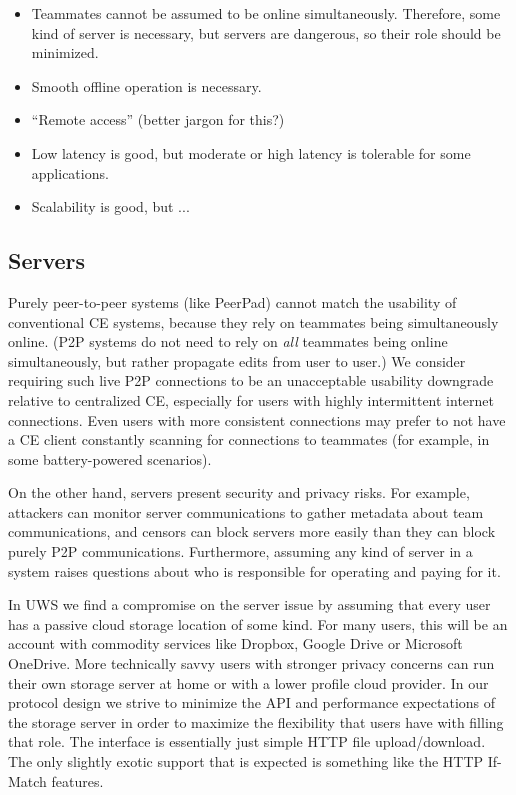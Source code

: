 \documentclass{article}
\begin{document}
\begin{itemize}
\item Teammates cannot be assumed to be online simultaneously.
  Therefore, some kind of server is necessary, but servers are dangerous, so their role should be minimized.
\item Smooth offline operation is necessary.
\item ``Remote access'' (better jargon for this?)
\item Low latency is good, but moderate or high latency is tolerable for some applications.
\item Scalability is good, but ...
\end{itemize}

\subsection{Servers}

Purely peer-to-peer systems (like PeerPad) cannot match the usability of conventional CE systems, because they rely on teammates being simultaneously online.
(P2P systems do not need to rely on \emph{all} teammates being online simultaneously, but rather propagate edits from user to user.)
We consider requiring such live P2P connections to be an unacceptable usability downgrade relative to centralized CE, especially for users with highly intermittent internet connections.
Even users with more consistent connections may prefer to not have a CE client constantly scanning for connections to teammates (for example, in some battery-powered scenarios).

On the other hand, servers present security and privacy risks.
For example, attackers can monitor server communications to gather metadata about team communications, and censors can block servers more easily than they can block purely P2P communications.
Furthermore, assuming any kind of server in a system raises questions about who is responsible for operating and paying for it.

In UWS we find a compromise on the server issue by assuming that every user has a passive cloud storage location of some kind.
For many users, this will be an account with commodity services like Dropbox, Google Drive or Microsoft OneDrive.
More technically savvy users with stronger privacy concerns can run their own storage server at home or with a lower profile cloud provider.
In our protocol design we strive to minimize the API and performance expectations of the storage server in order to maximize the flexibility that users have with filling that role.
The interface is essentially just simple HTTP file upload/download.
The only slightly exotic support that is expected is something like the HTTP If-Match features.
\end{document}
